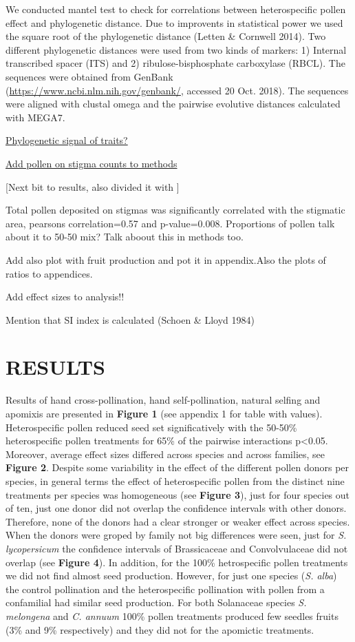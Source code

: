 \documentclass[11pt,a4paper]{article}
\begin{document}
We conducted mantel test to check for correlations between
heterospecific pollen effect and phylogenetic distance. Due to
improvents in statistical power we used the square root of the
phylogenetic distance (Letten \& Cornwell 2014). Two different
phylogenetic distances were used from two kinds of markers: 1) Internal
transcribed spacer (ITS) and 2) ribulose-bisphosphate carboxylase
(RBCL). The sequences were obtained from GenBank
(\url{https://www.ncbi.nlm.nih.gov/genbank/}, accessed 20 Oct. 2018).
The sequences were aligned with clustal omega and the pairwise evolutive
distances calculated with MEGA7.

\href{Jose}{Phylogenetic signal of traits?}

\href{Jose}{Add pollen on stigma counts to methods}

{[}Next bit to results, also divided it with {]}

Total pollen deposited on stigmas was significantly correlated with the
stigmatic area, pearsons correlation=0.57 and p-value=0.008. Proportions
of pollen talk about it to 50-50 mix? Talk aboout this in methods too.

Add also plot with fruit production and pot it in appendix.Also the
plots of ratios to appendices.

Add effect sizes to analysis!!

Mention that SI index is calculated (Schoen \& Lloyd 1984)

\section{RESULTS}\label{results}

Results of hand cross-pollination, hand self-pollination, natural
selfing and apomixis are presented in \textbf{Figure 1} (see appendix 1
for table with values). Heterospecific pollen reduced seed set
significatively with the 50-50\% heterospecific pollen treatments for
65\% of the pairwise interactions p\textless{}0.05. Moreover, average
effect sizes differed across species and across families, see
\textbf{Figure 2}. Despite some variability in the effect of the
different pollen donors per species, in general terms the effect of
heterospecific pollen from the distinct nine treatments per species was
homogeneous (see \textbf{Figure 3}), just for four species out of ten,
just one donor did not overlap the confidence intervals with other
donors. Therefore, none of the donors had a clear stronger or weaker
effect across species. When the donors were groped by family not big
differences were seen, just for \emph{S. lycopersicum} the confidence
intervals of Brassicaceae and Convolvulaceae did not overlap (see
\textbf{Figure 4}). In addition, for the 100\% hetrospecific pollen
treatments we did not find almost seed production. However, for just one
species (\emph{S. alba}) the control pollination and the heterospecific
pollination with pollen from a confamilial had similar seed production.
For both Solanaceae species \emph{S. melongena} and \emph{C. annuum}
100\% pollen treatments produced few seedles fruits (3\% and 9\%
respectively) and they did not for the apomictic treatments.
\end{document}
